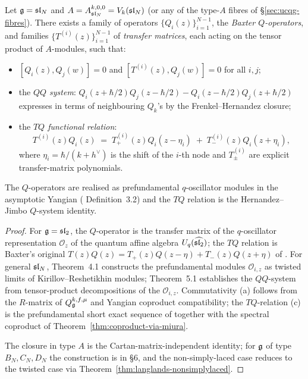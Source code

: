 \begin{theorem}
\label{thm:typeA-baxter-Q}
\ClaimStatusProvedHere
Let $\mathfrak{g} = \mathfrak{sl}_N$ and $A = A_{\mathfrak{sl}_N}^{k,0,0} = V_k(\mathfrak{sl}_N)$ (or any
of the type-$A$ fibres of \S\ref{sec:ucqg-fibres}). There exists a
family of operators $\{Q_i(z)\}_{i=1}^{N-1}$, the \emph{Baxter
$Q$-operators}, and families $\{T^{(i)}(z)\}_{i=1}^{N-1}$ of
\emph{transfer matrices}, each acting on the tensor product of
$A$-modules, such that:
\begin{itemize}
\item[(a)] $[Q_i(z), Q_j(w)] = 0$ and $[T^{(i)}(z), Q_j(w)] = 0$ for all $i, j$;
\item[(b)] the \emph{$QQ$ system}: $Q_i(z + \hbar/2) Q_j(z - \hbar/2) - Q_i(z - \hbar/2) Q_j(z + \hbar/2)$ expresses in terms of neighbouring $Q_k$'s by the Frenkel--Hernandez closure;
\item[(c)] the \emph{$TQ$ functional relation}:
\[
 T^{(i)}(z) Q_i(z) \;=\; T_{+}^{(i)}(z) Q_i(z - \eta_i) \;+\; T_{-}^{(i)}(z) Q_i(z + \eta_i),
\]
where $\eta_i = \hbar/(k+h^{\vee})$ is the shift of the $i$-th node
and $T_{\pm}^{(i)}$ are explicit transfer-matrix polynomials.
\end{itemize}
The $Q$-operators are realised as prefundamental $q$-oscillator
modules in the asymptotic Yangian (\cite{HernandezJimbo12}
Definition~3.2) and the $TQ$ relation is the Hernandez--Jimbo
$Q$-system identity.
\end{theorem}

\begin{proof}
For $\mathfrak{g} = \mathfrak{sl}_2$, the $Q$-operator is the transfer matrix of the
$q$-oscillator representation $\mathcal{O}_{z}$ of the quantum affine
algebra $U_q(\widehat{\mathfrak{sl}_2})$; the $TQ$ relation is Baxter's
original $T(z) Q(z) = T_{+}(z) Q(z - \eta) + T_{-}(z) Q(z + \eta)$
of \cite{BaxterEightVertex72}. For general $\mathfrak{sl}_N$,
\cite{HernandezJimbo12} Theorem~4.1 constructs the prefundamental
modules $\mathcal{O}_{i, z}$ as twisted limits of
Kirillov--Reshetikhin modules; \cite{FrenkelHernandez15} Theorem~5.1
establishes the $QQ$-system from tensor-product decompositions of the
$\mathcal{O}_{i,z}$. Commutativity (a) follows from the $R$-matrix of
$Q_{\mathfrak{g}}^{k,f,\mu}$ and Yangian coproduct compatibility; the
$TQ$-relation (c) is the prefundamental short exact sequence of
\cite[Theorem 3.7]{HernandezJimbo12} together with the spectral
coproduct of Theorem~\ref{thm:coproduct-via-miura}.

The closure in type $A$ is the Cartan-matrix-independent identity;
for $\mathfrak{g}$ of type $B_N, C_N, D_N$ the construction is in
\cite{FrenkelHernandez15} \S6, and the non-simply-laced case reduces
to the twisted case via Theorem~\ref{thm:langlands-nonsimplylaced}.
\end{proof}


